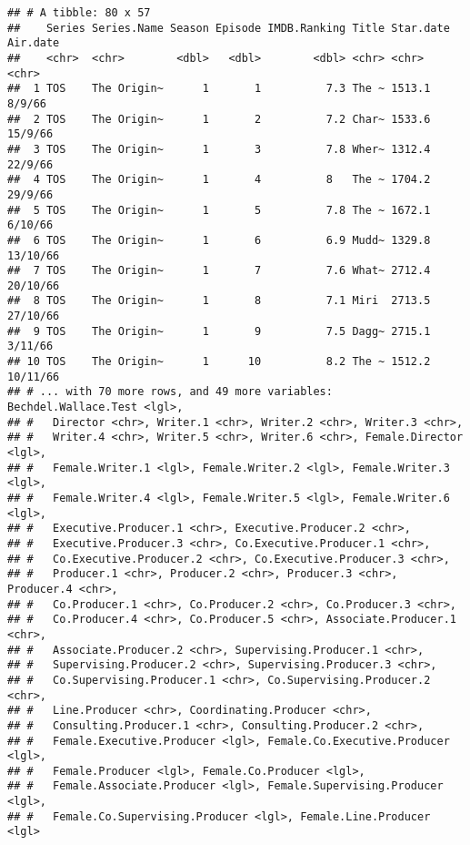\documentclass[
]{article}
\newenvironment{Shaded}{\begin{snugshade}}{\end{snugshade}}
\newcommand{\KeywordTok}[1]{\textcolor[rgb]{0.13,0.29,0.53}{\textbf{#1}}}
\newcommand{\NormalTok}[1]{#1}
\newcommand{\OperatorTok}[1]{\textcolor[rgb]{0.81,0.36,0.00}{\textbf{#1}}}
\newcommand{\OtherTok}[1]{\textcolor[rgb]{0.56,0.35,0.01}{#1}}
\newcommand{\StringTok}[1]{\textcolor[rgb]{0.31,0.60,0.02}{#1}}
\begin{document}
\begin{verbatim}
## # A tibble: 80 x 57
##    Series Series.Name Season Episode IMDB.Ranking Title Star.date Air.date
##    <chr>  <chr>        <dbl>   <dbl>        <dbl> <chr> <chr>     <chr>   
##  1 TOS    The Origin~      1       1          7.3 The ~ 1513.1    8/9/66  
##  2 TOS    The Origin~      1       2          7.2 Char~ 1533.6    15/9/66 
##  3 TOS    The Origin~      1       3          7.8 Wher~ 1312.4    22/9/66 
##  4 TOS    The Origin~      1       4          8   The ~ 1704.2    29/9/66 
##  5 TOS    The Origin~      1       5          7.8 The ~ 1672.1    6/10/66 
##  6 TOS    The Origin~      1       6          6.9 Mudd~ 1329.8    13/10/66
##  7 TOS    The Origin~      1       7          7.6 What~ 2712.4    20/10/66
##  8 TOS    The Origin~      1       8          7.1 Miri  2713.5    27/10/66
##  9 TOS    The Origin~      1       9          7.5 Dagg~ 2715.1    3/11/66 
## 10 TOS    The Origin~      1      10          8.2 The ~ 1512.2    10/11/66
## # ... with 70 more rows, and 49 more variables: Bechdel.Wallace.Test <lgl>,
## #   Director <chr>, Writer.1 <chr>, Writer.2 <chr>, Writer.3 <chr>,
## #   Writer.4 <chr>, Writer.5 <chr>, Writer.6 <chr>, Female.Director <lgl>,
## #   Female.Writer.1 <lgl>, Female.Writer.2 <lgl>, Female.Writer.3 <lgl>,
## #   Female.Writer.4 <lgl>, Female.Writer.5 <lgl>, Female.Writer.6 <lgl>,
## #   Executive.Producer.1 <chr>, Executive.Producer.2 <chr>,
## #   Executive.Producer.3 <chr>, Co.Executive.Producer.1 <chr>,
## #   Co.Executive.Producer.2 <chr>, Co.Executive.Producer.3 <chr>,
## #   Producer.1 <chr>, Producer.2 <chr>, Producer.3 <chr>, Producer.4 <chr>,
## #   Co.Producer.1 <chr>, Co.Producer.2 <chr>, Co.Producer.3 <chr>,
## #   Co.Producer.4 <chr>, Co.Producer.5 <chr>, Associate.Producer.1 <chr>,
## #   Associate.Producer.2 <chr>, Supervising.Producer.1 <chr>,
## #   Supervising.Producer.2 <chr>, Supervising.Producer.3 <chr>,
## #   Co.Supervising.Producer.1 <chr>, Co.Supervising.Producer.2 <chr>,
## #   Line.Producer <chr>, Coordinating.Producer <chr>,
## #   Consulting.Producer.1 <chr>, Consulting.Producer.2 <chr>,
## #   Female.Executive.Producer <lgl>, Female.Co.Executive.Producer <lgl>,
## #   Female.Producer <lgl>, Female.Co.Producer <lgl>,
## #   Female.Associate.Producer <lgl>, Female.Supervising.Producer <lgl>,
## #   Female.Co.Supervising.Producer <lgl>, Female.Line.Producer <lgl>
\end{verbatim}

\begin{Shaded}
\end{Shaded}
\end{document}
